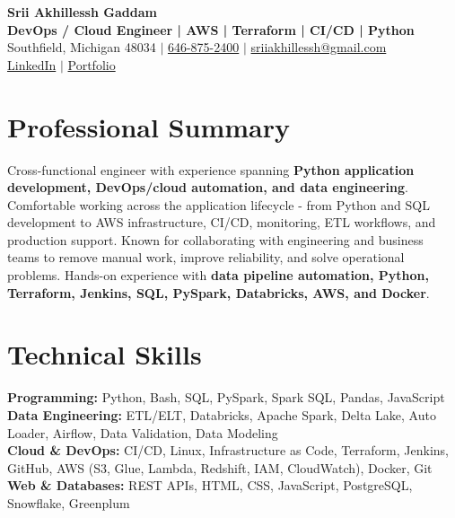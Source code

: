 \documentclass[letterpaper,10pt]{article}
\begin{document}
\fontsize{9.35pt}{10.45pt}\selectfont

\begin{center}
    {\LARGE \textbf{Srii Akhillessh Gaddam}} \\[-1pt]
    \textbf{DevOps / Cloud Engineer | AWS | Terraform | CI/CD | Python} \\[2pt]
    Southfield, Michigan 48034 $|$
    \href{tel:6468752400}{646-875-2400} $|$
    \href{mailto:sriiakhillessh@gmail.com}{sriiakhillessh@gmail.com} \\[1pt]
    \href{https://www.linkedin.com/in/srii-akhiilessh-gaddam-b48668191/}{LinkedIn} $|$
    \href{https://sriiakhillesshg.github.io/portfolio/}{Portfolio}
\end{center}
\vspace{-8pt}

\section{Professional Summary}
\small{Cross-functional engineer with experience spanning \textbf{Python application development, DevOps/cloud automation, and data engineering}. Comfortable working across the application lifecycle - from Python and SQL development to AWS infrastructure, CI/CD, monitoring, ETL workflows, and production support. Known for collaborating with engineering and business teams to remove manual work, improve reliability, and solve operational problems. Hands-on experience with \textbf{data pipeline automation, Python, Terraform, Jenkins, SQL, PySpark, Databricks, AWS, and Docker}.}

\section{Technical Skills}
\small{
\textbf{Programming:} Python, Bash, SQL, PySpark, Spark SQL, Pandas, JavaScript \\
\textbf{Data Engineering:} ETL/ELT, Databricks, Apache Spark, Delta Lake, Auto Loader, Airflow, Data Validation, Data Modeling \\
\textbf{Cloud \& DevOps:} CI/CD, Linux, Infrastructure as Code, Terraform, Jenkins, GitHub, AWS (S3, Glue, Lambda, Redshift, IAM, CloudWatch), Docker, Git \\
\textbf{Web \& Databases:} REST APIs, HTML, CSS, JavaScript, PostgreSQL, Snowflake, Greenplum
}
\end{document}
